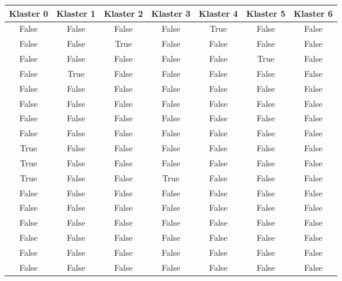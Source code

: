 \documentclass[../EDI_Task3_Karwowski_Kowalewski.tex]{subfiles}
\begin{document}
{{    %
        \begin{table}[!htbp]
            \scriptsize
            \centering
            \begin{tabular}{|c|c|c|c|c|c|c|}
                \hline
                Klaster 0 & Klaster 1 & Klaster 2 & Klaster 3 & Klaster 4 & Klaster 5 & Klaster 6 \\ \hline
                False   &   False   &   False   &   False   &    True   &   False   &   False \\
                False   &   False   &    True   &   False   &   False   &   False   &   False \\
                False   &   False   &   False   &   False   &   False   &    True   &   False \\
                False   &    True   &   False   &   False   &   False   &   False   &   False \\
                False   &   False   &   False   &   False   &   False   &   False   &   False \\
                False   &   False   &   False   &   False   &   False   &   False   &   False \\
                False   &   False   &   False   &   False   &   False   &   False   &   False \\
                False   &   False   &   False   &   False   &   False   &   False   &   False \\
                 True   &   False   &   False   &   False   &   False   &   False   &   False \\
                 True   &   False   &   False   &   False   &   False   &   False   &   False \\
                 True   &   False   &   False   &    True   &   False   &   False   &   False \\
                False   &   False   &   False   &   False   &   False   &   False   &   False \\
                False   &   False   &   False   &   False   &   False   &   False   &   False \\
                False   &   False   &   False   &   False   &   False   &   False   &   False \\
                False   &   False   &   False   &   False   &   False   &   False   &   False \\
                False   &   False   &   False   &   False   &   False   &   False   &   False \\
                False   &   False   &   False   &   False   &   False   &   False   &   False \\

\end{tabular}
\end{table}}}
\end{document}
